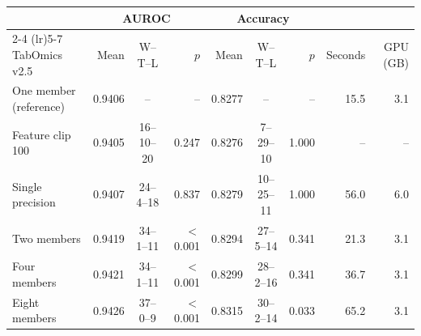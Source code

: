 \begin{tabular}{lrcrrcrrr}
\toprule
 & \multicolumn{3}{c}{AUROC} & \multicolumn{3}{c}{Accuracy} & & \\
\cmidrule(lr){2-4} \cmidrule(lr){5-7}
TabOmics v2.5 & Mean & W--T--L & $p$ & Mean & W--T--L & $p$ & Seconds & GPU (GB) \\
\midrule
One member (reference) & 0.9406 & -- & -- & 0.8277 & -- & -- & 15.5 & 3.1 \\
Feature clip 100 & 0.9405 & 16--10--20 & 0.247 & 0.8276 & 7--29--10 & 1.000 & -- & -- \\
Single precision & 0.9407 & 24--4--18 & 0.837 & 0.8279 & 10--25--11 & 1.000 & 56.0 & 6.0 \\
Two members & 0.9419 & 34--1--11 & $<$0.001 & 0.8294 & 27--5--14 & 0.341 & 21.3 & 3.1 \\
Four members & 0.9421 & 34--1--11 & $<$0.001 & 0.8299 & 28--2--16 & 0.341 & 36.7 & 3.1 \\
Eight members & 0.9426 & 37--0--9 & $<$0.001 & 0.8315 & 30--2--14 & 0.033 & 65.2 & 3.1 \\
\bottomrule
\end{tabular}
